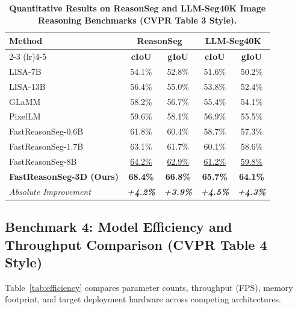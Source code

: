 \documentclass[10pt,twocolumn,letterpaper]{article}
\begin{document}
\begin{table}[ht]
\centering
\footnotesize
\caption{\textbf{Quantitative Results on ReasonSeg and LLM-Seg40K Image Reasoning Benchmarks (CVPR Table 3 Style).}}
\label{tab:reasonseg}
\begin{tabular*}{\columnwidth}{@{\extracolsep{\fill}}lcccc}
\toprule
\textbf{Method} & \multicolumn{2}{c}{\textbf{ReasonSeg}} & \multicolumn{2}{c}{\textbf{LLM-Seg40K}} \\
\cmidrule(lr){2-3} \cmidrule(lr){4-5}
& \textbf{cIoU} & \textbf{gIoU} & \textbf{cIoU} & \textbf{gIoU} \\
\midrule
LISA-7B~\cite{lai2023lisa} & 54.1\% & 52.8\% & 51.6\% & 50.2\% \\
LISA-13B~\cite{lai2023lisa} & 56.4\% & 55.0\% & 53.8\% & 52.4\% \\
GLaMM~\cite{rasheed2024glamm} & 58.2\% & 56.7\% & 55.4\% & 54.1\% \\
PixelLM~\cite{ren2024pixellm} & 59.6\% & 58.1\% & 56.9\% & 55.5\% \\
\midrule
FastReasonSeg-0.6B~\cite{shen2026fast} & 61.8\% & 60.4\% & 58.7\% & 57.3\% \\
FastReasonSeg-1.7B~\cite{shen2026fast} & 63.1\% & 61.7\% & 60.1\% & 58.6\% \\
FastReasonSeg-8B~\cite{shen2026fast} & \underline{64.2\%} & \underline{62.9\%} & \underline{61.2\%} & \underline{59.8\%} \\
\midrule
\textbf{FastReasonSeg-3D (Ours)} & \textbf{68.4\%} & \textbf{66.8\%} & \textbf{65.7\%} & \textbf{64.1\%} \\
\textit{Absolute Improvement} & \textit{\textbf{+4.2\%}} & \textit{\textbf{+3.9\%}} & \textit{\textbf{+4.5\%}} & \textit{\textbf{+4.3\%}} \\
\bottomrule
\end{tabular*}
\end{table}

\subsection{Benchmark 4: Model Efficiency and Throughput Comparison (CVPR Table 4 Style)}
Table~\ref{tab:efficiency} compares parameter counts, throughput (FPS), memory footprint, and target deployment hardware across competing architectures.
\end{document}
